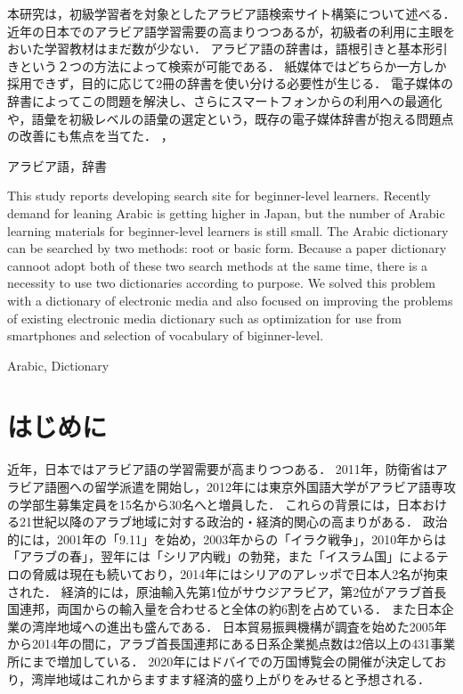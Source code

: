 \documentclass[technicalreport]{ieicej}
\begin{document}
\setarab
\begin{jabstract}
本研究は，初級学習者を対象としたアラビア語検索サイト構築について述べる．
近年の日本でのアラビア語学習需要の高まりつつあるが，初級者の利用に主眼をおいた学習教材はまだ数が少ない．
アラビア語の辞書は，語根引きと基本形引きという２つの方法によって検索が可能である．
紙媒体ではどちらか一方しか採用できず，目的に応じて2冊の辞書を使い分ける必要性が生じる．
電子媒体の辞書によってこの問題を解決し、さらにスマートフォンからの利用への最適化や，語彙を初級レベルの語彙の選定という，既存の電子媒体辞書が抱える問題点の改善にも焦点を当てた．
，
\end{jabstract}
\begin{jkeyword}
アラビア語，辞書
\end{jkeyword}
\begin{eabstract}
This study reports developing search site for beginner-level learners.
Recently demand for leaning Arabic is getting higher in Japan, but the number of Arabic learning materials for beginner-level learners is still small.
The Arabic dictionary can be searched by two methods: root or basic form.
Because a paper dictionary cannoot adopt both of these two search methods at the same time, there is a necessity to use two dictionaries according to purpose.
We solved this problem with a dictionary of electronic media and also focused on improving the problems of existing electronic media dictionary such as optimization for use from smartphones and selection of vocabulary of biginner-level.

\end{eabstract}
\begin{ekeyword}
Arabic, Dictionary
\end{ekeyword}
\maketitle
\section{はじめに}
近年，日本ではアラビア語の学習需要が高まりつつある．
2011年，防衛省はアラビア語圏への留学派遣を開始し\cite{nikkei}，2012年には東京外国語大学がアラビア語専攻の学部生募集定員を15名から30名へと増員した．
これらの背景には，日本おける21世紀以降のアラブ地域に対する政治的・経済的関心の高まりがある．
政治的には，2001年の「9.11」を始め，2003年からの「イラク戦争」，2010年からは「アラブの春」，翌年には「シリア内戦」の勃発，また「イスラム国」によるテロの脅威は現在も続いており，2014年にはシリアのアレッポで日本人2名が拘束された．
経済的には，原油輸入先第1位がサウジアラビア，第2位がアラブ首長国連邦，両国からの輸入量を合わせると全体の約6割を占めている\cite{teikoku}．
また日本企業の湾岸地域への進出も盛んである．
日本貿易振興機構が調査を始めた2005年から2014年の間に，アラブ首長国連邦にある日系企業拠点数は2倍以上の431事業所にまで増加している\cite{jetro}．
2020年にはドバイでの万国博覧会の開催が決定しており，湾岸地域はこれからますます経済的盛り上がりをみせると予想される．
\end{document}
